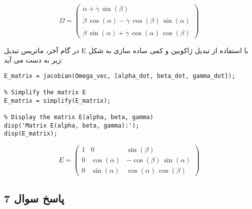 \[
\Omega = \left(\begin{array}{c}
	\dot{\alpha} + \dot{\gamma} \,\sin \left(\beta \right) \\
	\dot{\beta} \,\cos \left(\alpha \right) - \dot{\gamma} \,\cos \left(\beta \right) \,\sin \left(\alpha \right) \\
	\dot{\beta} \,\sin \left(\alpha \right) + \dot{\gamma} \,\cos \left(\alpha \right) \,\cos \left(\beta \right)
\end{array}\right)
\]

در گام آخر، ماتریس تبدیل E با استفاده از تبدیل ژاکوبین و کمی ساده سازی به شکل زیر به دست می آید:

\begin{latin}
	\begin{lstlisting}[frame=single,style=Matlab-Pyglike]
% Construct the matrix E by taking the Jacobian of Omega with respect to [alpha_dot; beta_dot; gamma_dot]
E_matrix = jacobian(Omega_vec, [alpha_dot, beta_dot, gamma_dot]);

% Simplify the matrix E
E_matrix = simplify(E_matrix);

% Display the matrix E(alpha, beta, gamma)
disp('Matrix E(alpha, beta, gamma):');
disp(E_matrix);

	\end{lstlisting}
\end{latin}

\[
E = \left(\begin{array}{ccc}
	1 & 0 & \sin \left(\beta \right) \\
	0 & \cos \left(\alpha \right) & -\cos \left(\beta \right) \,\sin \left(\alpha \right) \\
	0 & \sin \left(\alpha \right) & \cos \left(\alpha \right) \,\cos \left(\beta \right)
\end{array}\right)
\]



\subsection{ پاسخ سوال 7}


